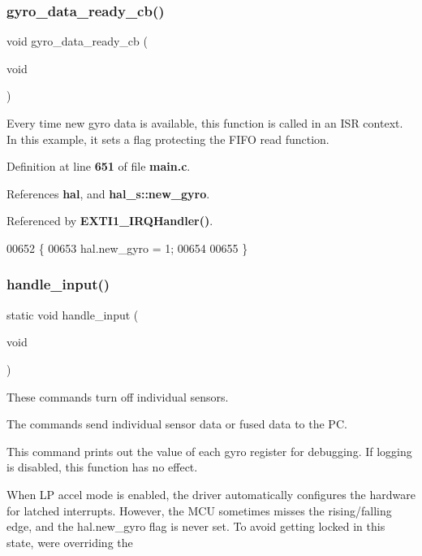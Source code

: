 \subsubsection{gyro\+\_\+data\+\_\+ready\+\_\+cb()}
{\footnotesize\ttfamily void gyro\+\_\+data\+\_\+ready\+\_\+cb (\begin{DoxyParamCaption}\item[{void}]{ }\end{DoxyParamCaption})}

Every time new gyro data is available, this function is called in an I\+SR context. In this example, it sets a flag protecting the F\+I\+FO read function. 

Definition at line \textbf{ 651} of file \textbf{ main.\+c}.



References \textbf{ hal}, and \textbf{ hal\+\_\+s\+::new\+\_\+gyro}.



Referenced by \textbf{ E\+X\+T\+I1\+\_\+\+I\+R\+Q\+Handler()}.


\begin{DoxyCode}
00652 \{
00653     hal.new_gyro = 1;
00654 
00655 \}
\end{DoxyCode}
\mbox{\label{group__eMPL_ga2ccb744024182ca302323f00a7acd796}} 
\subsubsection{handle\+\_\+input()}
{\footnotesize\ttfamily static void handle\+\_\+input (\begin{DoxyParamCaption}\item[{void}]{ }\end{DoxyParamCaption})\hspace{0.3cm}{\ttfamily [static]}}

These commands turn off individual sensors.

The commands send individual sensor data or fused data to the PC.

This command prints out the value of each gyro register for debugging. If logging is disabled, this function has no effect.

When LP accel mode is enabled, the driver automatically configures the hardware for latched interrupts. However, the M\+CU sometimes misses the rising/falling edge, and the hal.\+new\+\_\+gyro flag is never set. To avoid getting locked in this state, we\textquotesingle{}re overriding the

